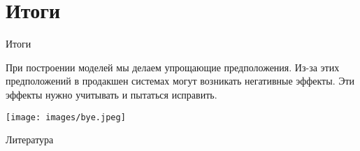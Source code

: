 \documentclass[11pt,aspectratio=169,handout]{beamer}
\begin{document}
\section{Итоги}

\begin{frame}{Итоги}

\begin{tcolorbox}[colback=info!5,colframe=info!80,title=]
При построении моделей мы делаем упрощающие предположения. Из-за этих предположений в продакшен системах могут возникать негативные эффекты. Эти эффекты нужно учитывать и пытаться исправить.
\end{tcolorbox}

\end{frame}

\begin{frame}
\begin{center}
\texttt{[image: images/bye.jpeg]}
\end{center}
\end{frame}

\begin{frame}[allowframebreaks]{Литература}




\end{frame}
\end{document}
